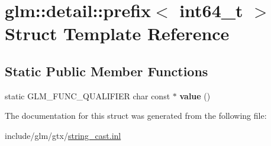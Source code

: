 \hypertarget{structglm_1_1detail_1_1prefix_3_01int64__t_01_4}{}\section{glm\+:\+:detail\+:\+:prefix$<$ int64\+\_\+t $>$ Struct Template Reference}
\label{structglm_1_1detail_1_1prefix_3_01int64__t_01_4}
\subsection*{Static Public Member Functions}
\begin{DoxyCompactItemize}
\item 
\mbox{\label{structglm_1_1detail_1_1prefix_3_01int64__t_01_4_a845043fc18700790972ca73ebc80ac4d}} 
static G\+L\+M\+\_\+\+F\+U\+N\+C\+\_\+\+Q\+U\+A\+L\+I\+F\+I\+ER char const  $\ast$ {\bfseries value} ()
\end{DoxyCompactItemize}


The documentation for this struct was generated from the following file\+:\begin{DoxyCompactItemize}
\item 
include/glm/gtx/\hyperlink{string__cast_8inl}{string\+\_\+cast.\+inl}\end{DoxyCompactItemize}
